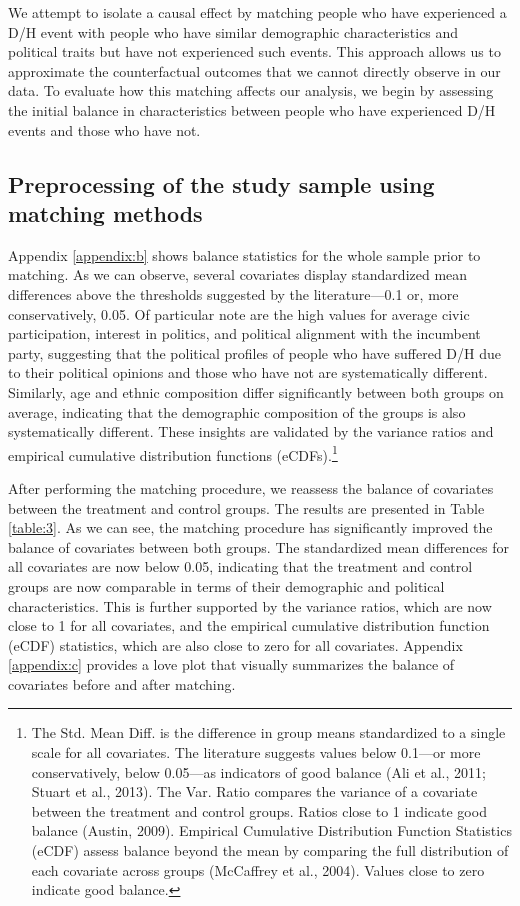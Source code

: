 \documentclass{article}
\begin{document}
We attempt to isolate a causal effect by matching people who have experienced a D/H event with people who have similar demographic characteristics and political traits but have not experienced such events. This approach allows us to approximate the counterfactual outcomes that we cannot directly observe in our data. To evaluate how this matching affects our analysis, we begin by assessing the initial balance in characteristics between people who have experienced D/H events and those who have not.

\subsection{Preprocessing of the study sample using matching methods}

Appendix \ref{appendix:b} shows balance statistics for the whole sample prior to matching. As we can observe, several covariates display standardized mean differences above the thresholds suggested by the literature—0.1 or, more conservatively, 0.05. Of particular note are the high values for average civic participation, interest in politics, and political alignment with the incumbent party, suggesting that the political profiles of people who have suffered D/H due to their political opinions and those who have not are systematically different. Similarly, age and ethnic composition differ significantly between both groups on average, indicating that the demographic composition of the groups is also systematically different. These insights are validated by the variance ratios and empirical cumulative distribution functions (eCDFs).\footnote{The Std. Mean Diff. is the difference in group means standardized to a single scale for all covariates. The literature suggests values below 0.1—or more conservatively, below 0.05—as indicators of good balance (Ali et al., 2011; Stuart et al., 2013). The Var. Ratio compares the variance of a covariate between the treatment and control groups. Ratios close to 1 indicate good balance (Austin, 2009). Empirical Cumulative Distribution Function Statistics (eCDF) assess balance beyond the mean by comparing the full distribution of each covariate across groups (McCaffrey et al., 2004). Values close to zero indicate good balance.}

After performing the matching procedure, we reassess the balance of covariates between the treatment and control groups. The results are presented in Table \ref{table:3}. As we can see, the matching procedure has significantly improved the balance of covariates between both groups. The standardized mean differences for all covariates are now below 0.05, indicating that the treatment and control groups are now comparable in terms of their demographic and political characteristics. This is further supported by the variance ratios, which are now close to 1 for all covariates, and the empirical cumulative distribution function (eCDF) statistics, which are also close to zero for all covariates. Appendix \ref{appendix:c} provides a love plot that visually summarizes the balance of covariates before and after matching.
\end{document}
